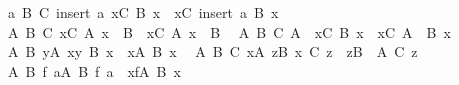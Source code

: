 \begin{isabellebody}
\ \ {\isachardoublequoteopen}{\isasymAnd}a\ B\ C{\isachardot}{\kern0pt}\ insert\ a\ {\isacharparenleft}{\kern0pt}{\isasymInter}x{\isasymin}C{\isachardot}{\kern0pt}\ B\ x{\isacharparenright}{\kern0pt}\ {\isacharequal}{\kern0pt}\ {\isacharparenleft}{\kern0pt}{\isasymInter}x{\isasymin}C{\isachardot}{\kern0pt}\ insert\ a\ {\isacharparenleft}{\kern0pt}B\ x{\isacharparenright}{\kern0pt}{\isacharparenright}{\kern0pt}{\isachardoublequoteclose}\isanewline
\ \ {\isachardoublequoteopen}{\isasymAnd}A\ B\ C{\isachardot}{\kern0pt}\ {\isacharparenleft}{\kern0pt}{\isacharparenleft}{\kern0pt}{\isasymInter}x{\isasymin}C{\isachardot}{\kern0pt}\ A\ x{\isacharparenright}{\kern0pt}\ {\isasymunion}\ B{\isacharparenright}{\kern0pt}\ {\isacharequal}{\kern0pt}\ {\isacharparenleft}{\kern0pt}{\isasymInter}x{\isasymin}C{\isachardot}{\kern0pt}\ A\ x\ {\isasymunion}\ B{\isacharparenright}{\kern0pt}{\isachardoublequoteclose}\isanewline
\ \ {\isachardoublequoteopen}{\isasymAnd}A\ B\ C{\isachardot}{\kern0pt}\ A\ {\isasymunion}\ {\isacharparenleft}{\kern0pt}{\isasymInter}x{\isasymin}C{\isachardot}{\kern0pt}\ B\ x{\isacharparenright}{\kern0pt}\ {\isacharequal}{\kern0pt}\ {\isacharparenleft}{\kern0pt}{\isasymInter}x{\isasymin}C{\isachardot}{\kern0pt}\ A\ {\isasymunion}\ B\ x{\isacharparenright}{\kern0pt}{\isachardoublequoteclose}\isanewline
\ \ {\isachardoublequoteopen}{\isasymAnd}A\ B{\isachardot}{\kern0pt}\ {\isacharparenleft}{\kern0pt}{\isasymInter}y{\isasymin}A{\isachardot}{\kern0pt}\ {\isasymInter}x{\isasymin}y{\isachardot}{\kern0pt}\ B\ x{\isacharparenright}{\kern0pt}\ {\isacharequal}{\kern0pt}\ {\isacharparenleft}{\kern0pt}{\isasymInter}x{\isasymin}{\isasymUnion}A{\isachardot}{\kern0pt}\ B\ x{\isacharparenright}{\kern0pt}{\isachardoublequoteclose}\isanewline
\ \ {\isachardoublequoteopen}{\isasymAnd}A\ B\ C{\isachardot}{\kern0pt}\ {\isacharparenleft}{\kern0pt}{\isasymInter}x{\isasymin}A{\isachardot}{\kern0pt}\ {\isasymInter}z{\isasymin}B\ x{\isachardot}{\kern0pt}\ C\ z{\isacharparenright}{\kern0pt}\ {\isacharequal}{\kern0pt}\ {\isacharparenleft}{\kern0pt}{\isasymInter}z{\isasymin}{\isacharparenleft}{\kern0pt}{\isasymUnion}{\isacharparenleft}{\kern0pt}B\ {\isacharbackquote}{\kern0pt}\ A{\isacharparenright}{\kern0pt}{\isacharparenright}{\kern0pt}{\isachardot}{\kern0pt}\ C\ z{\isacharparenright}{\kern0pt}{\isachardoublequoteclose}\isanewline
\ \ {\isachardoublequoteopen}{\isasymAnd}A\ B\ f{\isachardot}{\kern0pt}\ {\isacharparenleft}{\kern0pt}{\isasymInter}a{\isasymin}A{\isachardot}{\kern0pt}\ B\ {\isacharparenleft}{\kern0pt}f\ a{\isacharparenright}{\kern0pt}{\isacharparenright}{\kern0pt}\ {\isacharequal}{\kern0pt}\ {\isacharparenleft}{\kern0pt}{\isasymInter}x{\isasymin}f{\isacharbackquote}{\kern0pt}A{\isachardot}{\kern0pt}\ B\ x{\isacharparenright}{\kern0pt}{\isachardoublequoteclose}\isanewline

\end{isabellebody}
